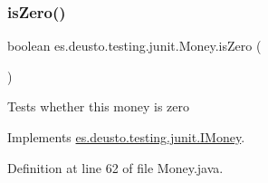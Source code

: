 \mbox{\label{classes_1_1deusto_1_1testing_1_1junit_1_1_money_a797658a03260b535e9a36ebbcc3b19c9}} 
\subsubsection{\texorpdfstring{is\+Zero()}{isZero()}}
{\footnotesize\ttfamily boolean es.\+deusto.\+testing.\+junit.\+Money.\+is\+Zero (\begin{DoxyParamCaption}{ }\end{DoxyParamCaption})}

Tests whether this money is zero 

Implements \hyperlink{interfacees_1_1deusto_1_1testing_1_1junit_1_1_i_money_a166c39b6f931e49769580a04f8c73500}{es.\+deusto.\+testing.\+junit.\+I\+Money}.



Definition at line 62 of file Money.\+java.

